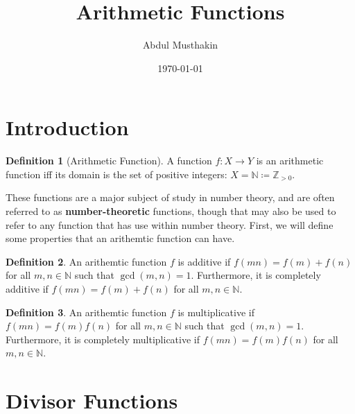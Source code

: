 \documentclass[a4paper]{article}
\title{Arithmetic Functions}
\author{Abdul Musthakin}
\date{\today}
\theoremstyle{definition}
\newtheorem{definition}{Definition}
\begin{document}
\maketitle

\section{Introduction}

\begin{definition}[Arithmetic Function]
    A function $f\colon X \to Y$ is an arithmetic function iff its domain is the set of positive integers: $X = \mathbb{N} \coloneq \mathbb{Z}_{>0}$.
\end{definition}
These functions are a major subject of study in number theory, and are often referred to as \textbf{number-theoretic} functions, though that may also be used to refer to any function that has use within number theory.
First, we will define some properties that an arithemtic function can have.
\begin{definition}
    An arithemtic function $f$ is additive if $f(mn) = f(m) + f(n)$ for all $m, n \in \mathbb{N}$ such that $\gcd(m,n)=1$.
    Furthermore, it is completely additive if $f(mn) = f(m) + f(n)$ for all $m, n \in \mathbb{N}$.
\end{definition}
\begin{definition}
    An arithemtic function $f$ is multiplicative if $f(mn) = f(m)f(n)$ for all $m, n \in \mathbb{N}$ such that $\gcd(m,n)=1$.
    Furthermore, it is completely multiplicative if $f(mn) = f(m)f(n)$ for all $m, n \in \mathbb{N}$.
\end{definition}

\section{Divisor Functions}
\end{document}
